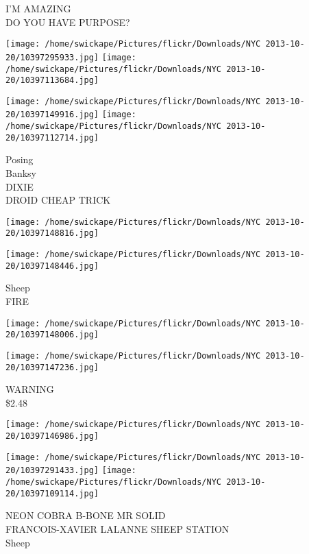 \documentclass[10pt,letterpaper]{article}
\begin{document}
I'M AMAZING\\
DO YOU HAVE PURPOSE?\\
\pagebreak

\texttt{[image: /home/swickape/Pictures/flickr/Downloads/NYC 2013-10-20/10397295933.jpg]}
\texttt{[image: /home/swickape/Pictures/flickr/Downloads/NYC 2013-10-20/10397113684.jpg]}

\texttt{[image: /home/swickape/Pictures/flickr/Downloads/NYC 2013-10-20/10397149916.jpg]}
\texttt{[image: /home/swickape/Pictures/flickr/Downloads/NYC 2013-10-20/10397112714.jpg]}

Posing\\
Banksy\\
DIXIE\\
DROID CHEAP TRICK\\
\pagebreak

\texttt{[image: /home/swickape/Pictures/flickr/Downloads/NYC 2013-10-20/10397148816.jpg]}

\vspace{0.25in}
\texttt{[image: /home/swickape/Pictures/flickr/Downloads/NYC 2013-10-20/10397148446.jpg]}

Sheep\\
FIRE\\
\pagebreak

\texttt{[image: /home/swickape/Pictures/flickr/Downloads/NYC 2013-10-20/10397148006.jpg]}

\vspace{0.25in}
\texttt{[image: /home/swickape/Pictures/flickr/Downloads/NYC 2013-10-20/10397147236.jpg]}

WARNING\\
\$2.48\\
\pagebreak

\texttt{[image: /home/swickape/Pictures/flickr/Downloads/NYC 2013-10-20/10397146986.jpg]}

\vspace{0.25in}
\texttt{[image: /home/swickape/Pictures/flickr/Downloads/NYC 2013-10-20/10397291433.jpg]}
\texttt{[image: /home/swickape/Pictures/flickr/Downloads/NYC 2013-10-20/10397109114.jpg]}

NEON COBRA B{-}BONE MR SOLID\\
FRANCOIS{-}XAVIER LALANNE SHEEP STATION\\
Sheep\\
\pagebreak
\end{document}
